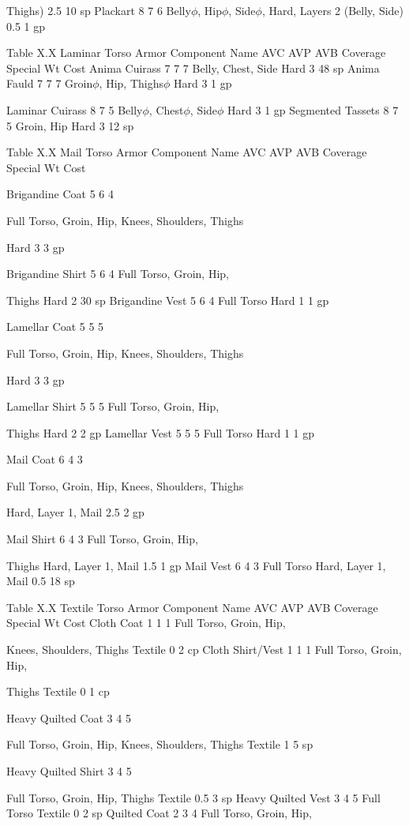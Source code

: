 \documentclass[oneside,11pt,english]{book}
\begin{document}
Thighs) 2.5 10 sp
Plackart 8 7 6 Belly$\phi$, Hip$\phi$, Side$\phi$, Hard, Layers 2 (Belly, Side) 0.5 1 gp

Table X.X Laminar Torso Armor
Component Name AVC AVP AVB Coverage Special Wt Cost
Anima Cuirass 7 7 7 Belly, Chest, Side Hard 3 48 sp
Anima Fauld 7 7 7 Groin$\phi$, Hip, Thighs$\phi$ Hard 3 1 gp


Laminar Cuirass 8 7 5 Belly$\phi$, Chest$\phi$, Side$\phi$ Hard 3 1 gp
Segmented Tassets 8 7 5 Groin, Hip Hard 3 12 sp

Table X.X Mail Torso Armor
Component Name AVC AVP AVB Coverage Special Wt Cost

Brigandine Coat 5 6 4

Full Torso, Groin, Hip, 
Knees, Shoulders, 
Thighs

Hard 3 3 gp

Brigandine Shirt 5 6 4 Full Torso, Groin, Hip, 

Thighs Hard 2 30 sp
Brigandine Vest 5 6 4 Full Torso Hard 1 1 gp

Lamellar Coat 5 5 5

Full Torso, Groin, Hip, 
Knees, Shoulders, 
Thighs 

Hard 3 3 gp

Lamellar Shirt 5 5 5 Full Torso, Groin, Hip, 

Thighs Hard 2 2 gp
Lamellar Vest 5 5 5 Full Torso Hard 1 1 gp

Mail Coat 6 4 3

Full Torso, Groin, Hip, 
Knees, Shoulders, 
Thighs

Hard, Layer 1, Mail 2.5 2 gp

Mail Shirt 6 4 3 Full Torso, Groin, Hip, 

Thighs Hard, Layer 1, Mail 1.5 1 gp
Mail Vest 6 4 3 Full Torso Hard, Layer 1, Mail 0.5 18 sp

Table X.X Textile Torso Armor
Component Name AVC AVP AVB Coverage Special Wt Cost
Cloth Coat 1 1 1 Full Torso, Groin, Hip, 

Knees, Shoulders, Thighs Textile 0 2 cp
Cloth Shirt/Vest 1 1 1 Full Torso, Groin, Hip, 

Thighs Textile 0 1 cp

Heavy Quilted 
Coat 3 4 5

Full Torso, Groin, Hip, 
Knees, Shoulders, Thighs Textile 1 5 sp

Heavy Quilted 
Shirt 3 4 5

Full Torso, Groin, Hip, 
Thighs Textile 0.5 3 sp
Heavy Quilted Vest 3 4 5 Full Torso Textile 0 2 sp
Quilted Coat 2 3 4 Full Torso, Groin, Hip, 
\end{document}
